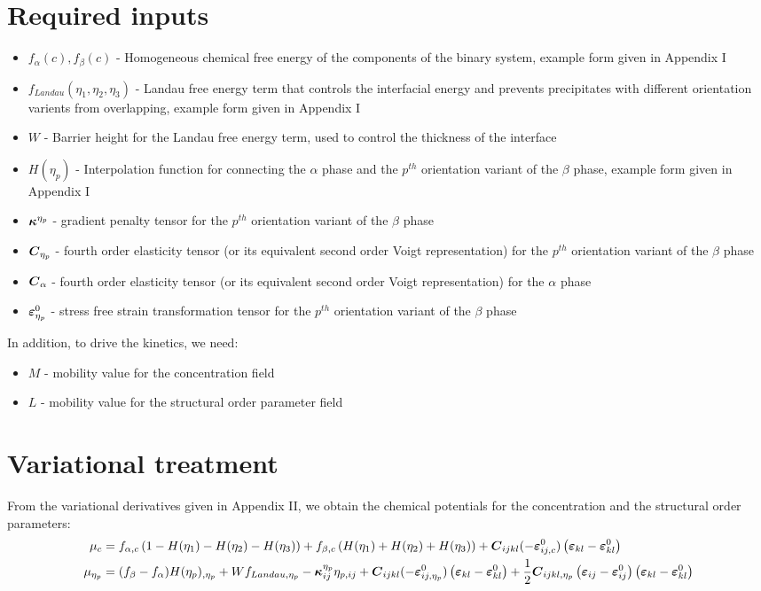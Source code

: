 \documentclass[11pt]{article}
\renewcommand{\=}[1]{\stackrel{#1}{=}} %
\theoremstyle{definition}
\theoremstyle{remark}
\def\Bkappa{\mbox{\boldmath$\kappa$}}
\def\Bvarepsilon{\mbox{\boldmath$\varepsilon$}}
\def\bC{\mbox{\boldmath$ C$}}
\begin{document}
\section{Required inputs}
\begin{itemize}
\item $f_{\alpha}(c), f_{\beta}(c)$ - Homogeneous chemical free energy of the components of the binary system, example form given in Appendix I
\item $f_{Landau}(\eta_1, \eta_2, \eta_3)$ - Landau free energy term that controls the interfacial energy and prevents precipitates with different orientation varients from overlapping, example form given in Appendix I
\item $W$ - Barrier height for the Landau free energy term, used to control the thickness of the interface 
\item $H(\eta_p)$ - Interpolation function for connecting the $\alpha$ phase and the $p^{th}$ orientation variant of the $\beta$ phase, example form given in Appendix I
\item $\Bkappa^{\eta_p}$  - gradient penalty tensor for the $p^{th}$ orientation variant of the $\beta$ phase
\item $\bC_{\eta_p}$ - fourth order elasticity tensor (or its equivalent second order Voigt representation) for the $p^{th}$ orientation variant of the $\beta$ phase
\item $\bC_{\alpha}$ - fourth order elasticity tensor (or its equivalent second order Voigt representation) for the $\alpha$ phase
\item $\Bvarepsilon^0_{\eta_p}$ - stress free strain transformation tensor for the $p^{th}$ orientation variant of the $\beta$ phase
\end{itemize}
In addition, to drive the kinetics, we need:
\begin{itemize}
\item $M$  - mobility value for the concentration field
\item $L$  - mobility value for the structural order parameter field
\end{itemize}

\section{Variational treatment}
From the variational derivatives given in Appendix II, we obtain the chemical potentials for the concentration and the structural order parameters:
\begin{align}
  \mu_{c}  &= f_{\alpha,c} \left( 1- H(\eta_1)-H(\eta_2)-H(\eta_3)\right) +f_{\beta,c} \left(  H(\eta_1)  + H(\eta_2) + H(\eta_3) \right)  + \bC_{ijkl} (- \Bvarepsilon^0_{ij,c}) \left( \Bvarepsilon_{kl} - \Bvarepsilon^0_{kl}\right) \\
  \mu_{\eta_p}  &= (f_{\beta}-f_{\alpha})H(\eta_p)_{,\eta_p} + W f_{Landau,\eta_p}- \Bkappa^{\eta_p}_{ij} \eta_{p,ij} + \bC_{ijkl} (- \Bvarepsilon^0_{ij,\eta_p}) \left( \Bvarepsilon_{kl} - \Bvarepsilon^0_{kl}\right) + \frac{1}{2} \bC_{ijkl,\eta_p} \left( \Bvarepsilon_{ij} - \Bvarepsilon ^0_{ij} \right) \left( \Bvarepsilon_{kl} - \Bvarepsilon^0_{kl}\right)
\end{align}
\end{document}
